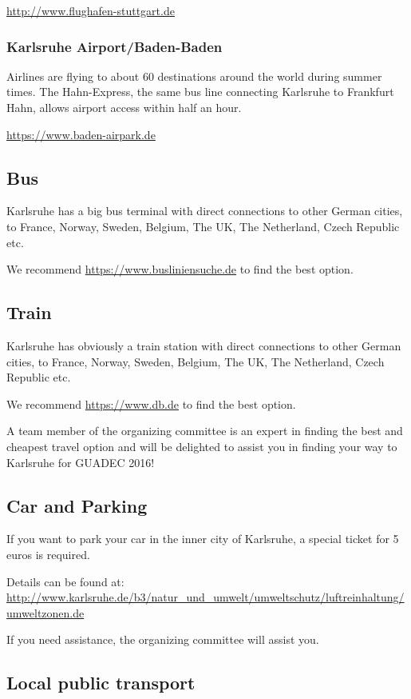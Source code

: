 \url{http://www.flughafen-stuttgart.de}

\subsubsection{Karlsruhe Airport/Baden-Baden}

Airlines are flying to about 60 destinations around the world during summer times. The Hahn-Express, the same bus line connecting Karlsruhe to Frankfurt Hahn, allows airport access within half an hour.
 
\url{https://www.baden-airpark.de}

\subsection{Bus}

Karlsruhe has a big bus terminal with direct connections to other German cities, to France, Norway, Sweden, Belgium, The UK, The Netherland, Czech Republic etc.

We recommend \url{https://www.busliniensuche.de} to find the best option.

\subsection{Train}

Karlsruhe has obviously a train station with direct connections to other German cities, to France, Norway, Sweden, Belgium, The UK, The Netherland, Czech Republic etc.

We recommend \url{https://www.db.de} to find the best option.

A team member of the organizing committee is an expert in finding the best and cheapest travel option and will be delighted to assist you in finding your way to Karlsruhe for GUADEC 2016!

\subsection{Car and Parking}

If you want to park your car in the inner city of Karlsruhe, a special ticket for 5 euros is required. 

Details can be found at:
\url{http://www.karlsruhe.de/b3/natur_und_umwelt/umweltschutz/luftreinhaltung/umweltzonen.de}

If you need assistance, the organizing committee will assist you.

\subsection{Local public transport}



